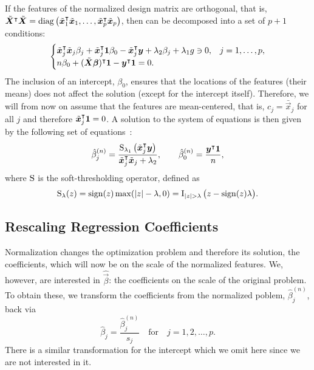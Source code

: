 If the features of the normalized design matrix are orthogonal, that is,
\(\tilde{\boldsymbol{X}}^\intercal \tilde{\boldsymbol{X}} = \operatorname{diag}\left(\tilde{\boldsymbol{x}}_1^\intercal
\tilde{\boldsymbol{x}}_1, \dots, \tilde{\boldsymbol{x}}_p^\intercal \tilde{\boldsymbol{x}}_p\right) \), then
 can be decomposed into a set of \(p + 1\) conditions:
\[
  \begin{cases}
    \tilde{\boldsymbol{x}}_j^\intercal \tilde{\boldsymbol{x}}_j \beta_j + \tilde{\boldsymbol{x}}_j^\intercal \boldsymbol{1} \beta_0 - \tilde{\boldsymbol{x}}_j^\intercal\boldsymbol{y} + \lambda_2 \beta_j + \lambda_1 g \ni 0, & j=1,\dots,p, \\
    n \beta_0 + (\tilde{\boldsymbol{X}}\boldsymbol{\beta})^\intercal \boldsymbol{1} -  \boldsymbol{y}^\intercal \boldsymbol{1} = 0.
  \end{cases}
\]
The inclusion of an intercept, \(\beta_0\), ensures that the locations of the features
(their means) does not affect the solution (except for the intercept itself). Therefore, we
will from now on assume that the features are mean-centered, that is, \(c_j =
\bar{\vec{x}}_j\) for all \(j\) and therefore \(\tilde{\boldsymbol{x}}_j^\intercal \boldsymbol{1} = 0\). A
solution to the system of equations is then given by the following set of
equations~\citep{donoho1994}:
\begin{equation*}
  \label{eq:orthogonal-solution-normalized}
  \hat{\beta}^{(n)}_j = \frac{\operatorname{S}_{\lambda_1}\left(\tilde{\boldsymbol{x}}_j^\intercal \boldsymbol{y}\right)}{\tilde{\boldsymbol{x}}_j^\intercal \tilde{\boldsymbol{x}}_j + \lambda_2},
  \qquad
  \hat{\beta}_0^{(n)} = \frac{\boldsymbol{y}^\intercal \boldsymbol{1}}{n},
\end{equation*}
where \(\operatorname{S}\) is the soft-thresholding operator, defined as
\[
  \st_\lambda(z) = \sign(z) \max(|z| - \lambda, 0) = \ind{|z|>\lambda}\big(z - \sign(z)\lambda\big).
\]

\subsection{Rescaling Regression Coefficients}

Normalization changes the optimization problem and therefore its solution, the
coefficients, which will now be on the scale of the normalized features. We, however, are
interested in \(\hat{\vec{\beta}}\): the coefficients on the scale of the original problem.
To obtain these, we transform the coefficients from the normalized poblem,
\(\hat\beta^{(n)}_j\), back via
\begin{equation}
  \label{eq:orthogonal-solution}
  \hat\beta_j = \frac{\hat\beta^{(n)}_j}{s_j} \quad\text{for}\quad j = 1,2,\dots,p.
\end{equation}
There is a similar transformation for the intercept which we omit here since we are not interested in it.

